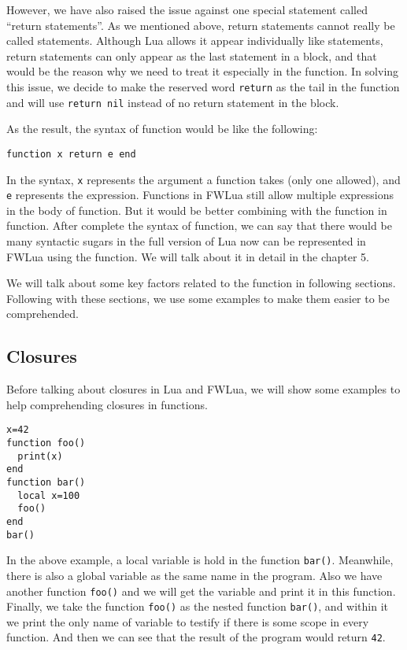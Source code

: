 However, we have also raised the issue against one special statement called ``return statements''. As we mentioned above, return statements cannot really be called statements. Although Lua allows it appear individually like statements, return statements can only appear as the last statement in a block, and that would be the reason why we need to treat it especially in the function. In solving this issue, we decide to make the reserved word {\tt return} as the tail in the function and will use {\tt return nil} instead of no return statement in the block.

As the result, the syntax of function would be like the following:
\begin{flushleft}
\tt function x {\tt return} e {\tt end}
\end{flushleft}
In the syntax, {\tt x} represents the argument a function takes (only one allowed), and {\tt e} represents the expression. Functions in FWLua still allow multiple expressions in the body of function. But it would be better combining with the function in function. After complete the syntax of function, we can say that there would be many syntactic sugars in the full version of Lua now can be represented in FWLua using the function. We will talk about it in detail in the chapter 5. 

We will talk about some key factors related to the function in following sections. Following with these sections, we use some examples to make them easier to be comprehended.

\subsection{Closures}
Before talking about closures in Lua and FWLua, we will show some examples to help comprehending closures in functions.
\begin{flushleft}
{\tt x=42\\
function foo()\\
~~print(x)\\
end\\
function bar()\\
~~local x=100\\
~~foo()\\
end\\
bar()}
\end{flushleft}
In the above example, a local variable is hold in the function {\tt bar()}. Meanwhile, there is also a global variable as the same name in the program. Also we have another function {\tt foo()} and we will get the variable and print it in this function. Finally, we take the function {\tt foo()} as the nested function {\tt bar()}, and within it we print the only name of variable to testify if there is some scope in every function. And then we can see that the result of the program would return {\tt 42}.

